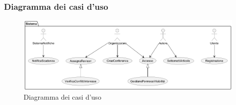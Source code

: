 \subsubsection{Diagramma dei casi d'uso}
\label{sec:diagramma_casi_uso}
\begin{figure}[!ht]
  \centering
  \includegraphics[width=\linewidth]{./VisualParadigm/diagramma_uso.png}
  \caption{Diagramma dei casi d'uso}
  \label{fig:diagramma_uso}
\end{figure}

